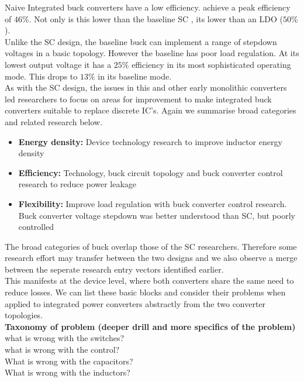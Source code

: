 \documentclass[letterpaper,twocolumn,10pt]{article}
\begin{document}
Naive Integrated buck converters have a low efficiency. \cite{Alimadadi2008} achieve a peak efficiency of $46\%$. Not only is this lower than the baseline SC \cite{Viraj2007}, its lower than an LDO ($50\%$).\\
Unlike the SC design, the baseline buck can implement a range of stepdown voltages in a basic topology. However the baseline has poor load regulation. At its lowest output voltage it has a $25\%$ efficiency in its most sophisticated operating mode. This drops to $13\%$ in its baseline mode.\\ 
As with the SC design, the issues in this and other early monolithic converters led researchers to focus on areas for improvement to make integrated buck converters suitable to replace discrete IC's. Again we summarise broad categories and related research below.
\begin{itemize}
\item \textbf{Energy density: }Device technology research to improve inductor energy density
\item \textbf{Efficiency: }Technology, buck circuit topology and buck converter control research to reduce power leakage
\item \textbf{Flexibility: }Improve load regulation with buck converter control research. Buck converter voltage stepdown was better understood than SC, but poorly controlled
\end{itemize}
The broad categories of buck overlap those of the SC researchers. Therefore some research effort may transfer between the two designs and we also observe a merge between the seperate research entry vectors identified earlier.\\
This manifests at the device level, where both converters share the same need to reduce losses. We can list these basic blocks and consider their problems when applied to integrated power converters abstractly from the two converter topologies.\\  
\textbf{Taxonomy of problem (deeper drill and more specifics of the problem)}\\
what is wrong with the switches?\\ %
what is wrong with the control? \\
What is wrong with the capacitors?\\
What is wrong with the inductors?\\
\end{document}
